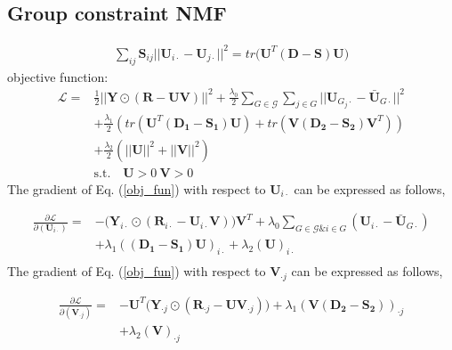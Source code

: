 \documentclass{bioinfo}
\begin{document}
\begin{methods}
\subsection{Group constraint NMF}
\begin{equation}\label{}
\begin{split}
\sum_{ij}^{}\bm{S}_{ij}||\bm{U}_{i\cdot}-\bm{U}_{j\cdot}||^2
=tr\Big(\bm{U}^T(\bm{D}-\bm{S})\bm{U}\Big)
\end{split}
\end{equation}
objective function:
\begin{equation}\label{obj_fun}
\begin{split}
\mathcal{L}=&\frac{1}{2}||\bm{Y} \odot (\bm{R} -\bm{U}\bm{V})||^2
+\frac{\lambda_0}{2}\sum_{G\in\mathcal{G}}^{}\sum_{j\in G}^{}||\bm{U}_{G_j\cdot}-\bar{\bm{U}}_{G\cdot}||^2
\\
&+\frac{\lambda_1}{2}(tr(\bm{U}^T(\bm{D_1-S_1})\bm{U})+tr(\bm{V}(\bm{D_2-S_2})\bm{V}^T))\\
&  +\frac{\lambda_2}{2} (||\bm{U}||^2+||\bm{V}||^2)\\
&\mathrm{s.t. }\quad \bm{U}>0\ \bm{V}>0
\end{split}
\end{equation}
The gradient of Eq. (\ref{obj_fun}) with respect to $\bm{U}_{i\cdot}$ can be expressed as follows,

\begin{equation}\label{equ:U_gradient}
\begin{split}
\frac{\partial{\mathcal{L}}}{\partial{(\bm{U}_{i\cdot})}}=
&-\Big(\bm{Y}_{i\cdot} \odot (\bm{R}_{i\cdot} -\bm{U}_{i\cdot}\bm{V})\Big)\bm{V}^T
+\lambda_0\sum_{G\in\mathcal{G}\&i\in G}^{}(\bm{U}_{i\cdot}-\bar{\bm{U}}_{G\cdot})
\\
&+\lambda_1 (\bm{(D_1-S_1)U})_{i\cdot}+\lambda_2(\bm{U})_{i\cdot}\\
\end{split}
\end{equation}
The gradient of Eq. (\ref{obj_fun}) with respect to $\bm{V}_{\cdot j}$ can be expressed as follows,

\begin{equation}\label{equ:V_gradient}
\begin{split}
\frac{\partial{\mathcal{L}}}{\partial{(\bm{V}_{\cdot j})}}=
&-\bm{U}^T\Big(\bm{Y}_{\cdot j} \odot (\bm{R}_{\cdot j} -\bm{U}\bm{V}_{\cdot j})\Big)
+\lambda_1 (\bm{V(D_2-S_2)})_{\cdot j}\\
&+\lambda_2(\bm{V})_{\cdot j}\\
\end{split}
\end{equation}

\end{methods}
\end{document}
